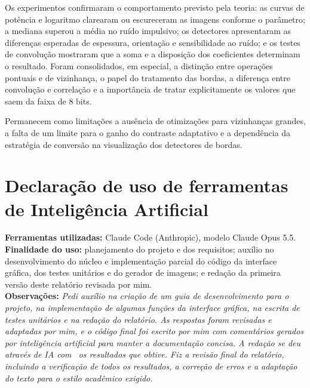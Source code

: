 \documentclass[11pt,a4paper]{article}
\newcommand{\placeholder}[1]{\textcolor{muted}{\textit{#1}}}
\begin{document}
Os experimentos confirmaram o comportamento previsto pela teoria: as curvas de potência e
logaritmo clarearam ou escureceram as imagens conforme o parâmetro; a mediana superou a média no
ruído impulsivo; os detectores apresentaram as diferenças esperadas de espessura, orientação e
sensibilidade ao ruído; e os testes de convolução mostraram que a soma e a disposição dos
coeficientes determinam o resultado. Foram consolidados, em especial, a distinção entre operações
pontuais e de vizinhança, o papel do tratamento das bordas, a diferença entre convolução e
correlação e a importância de tratar explicitamente os valores que saem da faixa de 8 bits.

Permanecem como limitações a ausência de otimizações para vizinhanças grandes, a falta de um
limite para o ganho do contraste adaptativo e a dependência da estratégia de conversão na
visualização dos detectores de bordas.

\section{Declaração de uso de ferramentas de Inteligência Artificial}

\begin{campo}
\textbf{Ferramentas utilizadas:} Claude Code (Anthropic), modelo Claude Opus 5.5.\\[3mm]
\textbf{Finalidade do uso:} planejamento do projeto e dos requisitos; auxílio no desenvolvimento do núcleo e implementação parcial do código
da interface gráfica, dos testes unitários e do gerador de imagens; e redação da primeira versão deste relatório revisada por mim.\\[3mm]
\textbf{Observações:} \placeholder{Pedi auxílio na criação de um guia de desenvolvimento para o projeto, na implementação de algumas funções da 
interface gráfica, na escrita de testes unitários e na redação do relatório. As respostas foram revisadas e adaptadas por mim, e o código final 
foi escrito por mim com comentários gerados por inteligência artificial para manter a documentação concisa. A redação se deu através de IA com \
os resultados que obtive. Fiz a revisão final do relatório, incluindo a verificação de todos os resultados, a correção de erros e a adaptação do 
texto para o estilo acadêmico exigido.}
\end{campo}
\end{document}
